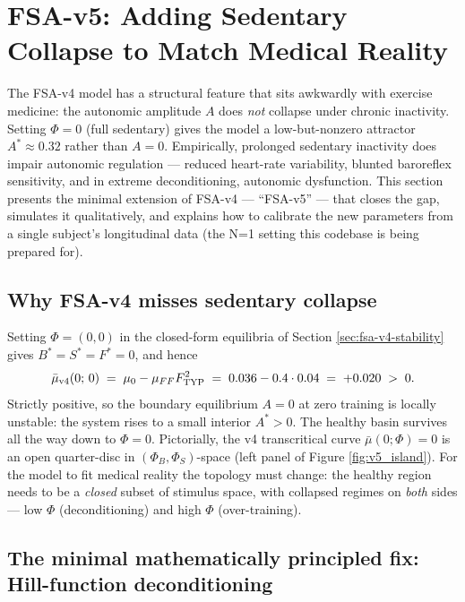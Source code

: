 \section{FSA-v5: Adding Sedentary Collapse to Match Medical Reality} \label{sec:fsa-v5-sketch}

The FSA-v4 model has a structural feature that sits awkwardly with exercise medicine: the autonomic amplitude $A$ does \emph{not} collapse under chronic inactivity. Setting $\Phi = 0$ (full sedentary) gives the model a low-but-nonzero attractor $A^* \approx 0.32$ rather than $A = 0$. Empirically, prolonged sedentary inactivity does impair autonomic regulation --- reduced heart-rate variability, blunted baroreflex sensitivity, and in extreme deconditioning, autonomic dysfunction. This section presents the minimal extension of FSA-v4 --- ``FSA-v5'' --- that closes the gap, simulates it qualitatively, and explains how to calibrate the new parameters from a single subject's longitudinal data (the N=1 setting this codebase is being prepared for).

\subsection{Why FSA-v4 misses sedentary collapse}

Setting $\Phi = (0, 0)$ in the closed-form equilibria of Section \ref{sec:fsa-v4-stability} gives $B^* = S^* = F^* = 0$, and hence
\begin{equation}
\bar\mu_{\rm v4}(0;\, 0) \;=\; \mu_0 - \mu_{FF} F_{\rm TYP}^2 \;=\; 0.036 - 0.4 \cdot 0.04 \;=\; +0.020 \;>\; 0.
\label{eq:v4-mu0-sedentary}
\end{equation}
Strictly positive, so the boundary equilibrium $A = 0$ at zero training is locally unstable: the system rises to a small interior $A^* > 0$. The healthy basin survives all the way down to $\Phi = 0$. Pictorially, the v4 transcritical curve $\bar\mu(0;\Phi) = 0$ is an open quarter-disc in $(\Phi_B, \Phi_S)$-space (left panel of Figure \ref{fig:v5_island}). For the model to fit medical reality the topology must change: the healthy region needs to be a \emph{closed} subset of stimulus space, with collapsed regimes on \emph{both} sides --- low $\Phi$ (deconditioning) and high $\Phi$ (over-training).

\subsection{The minimal mathematically principled fix: Hill-function deconditioning}

